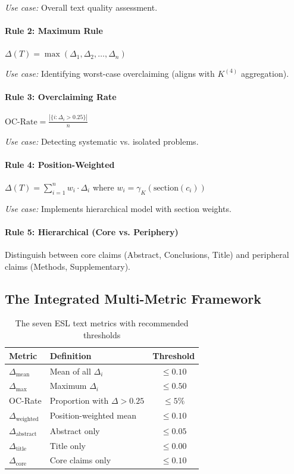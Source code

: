 \textit{Use case:} Overall text quality assessment.

\paragraph{Rule 2: Maximum Rule}
$\Delta(T) = \max(\Delta_1, \Delta_2, \ldots, \Delta_n)$

\textit{Use case:} Identifying worst-case overclaiming (aligns with $K^{(4)}$ aggregation).

\paragraph{Rule 3: Overclaiming Rate}
$\text{OC-Rate} = \frac{|\{i : \Delta_i > 0.25\}|}{n}$

\textit{Use case:} Detecting systematic vs. isolated problems.

\paragraph{Rule 4: Position-Weighted}
$\Delta(T) = \sum_{i=1}^{n} w_i \cdot \Delta_i$ where $w_i = \gamma_K(\text{section}(c_i))$

\textit{Use case:} Implements hierarchical model with section weights.

\paragraph{Rule 5: Hierarchical (Core vs. Periphery)}
Distinguish between core claims (Abstract, Conclusions, Title) and peripheral claims (Methods, Supplementary).


\subsection{The Integrated Multi-Metric Framework}

\begin{table}[H]
\centering
\caption{The seven ESL text metrics with recommended thresholds}
\begin{tabular}{llc}
\toprule
\textbf{Metric} & \textbf{Definition} & \textbf{Threshold} \\
\midrule
$\Delta_{\text{mean}}$ & Mean of all $\Delta_i$ & $\leq 0.10$ \\
$\Delta_{\text{max}}$ & Maximum $\Delta_i$ & $\leq 0.50$ \\
OC-Rate & Proportion with $\Delta > 0.25$ & $\leq 5\%$ \\
$\Delta_{\text{weighted}}$ & Position-weighted mean & $\leq 0.10$ \\
$\Delta_{\text{abstract}}$ & Abstract only & $\leq 0.05$ \\
$\Delta_{\text{title}}$ & Title only & $\leq 0.00$ \\
$\Delta_{\text{core}}$ & Core claims only & $\leq 0.10$ \\
\bottomrule
\end{tabular}
\end{table}

